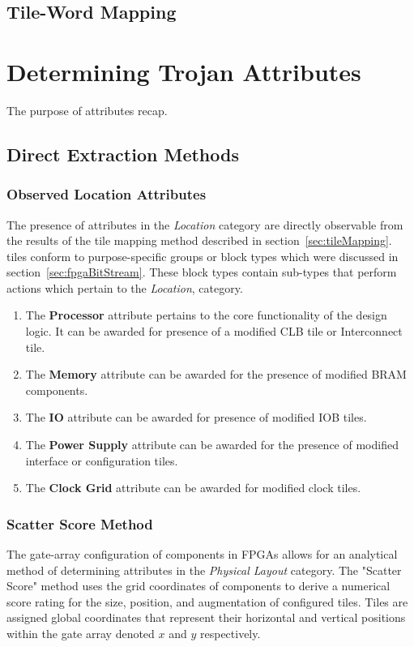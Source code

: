 \subsection{Tile-Word Mapping}

\section{Determining Trojan Attributes} \label{sec:trojanAttributes}
The purpose of attributes recap.
\subsection{Direct Extraction Methods}
\subsubsection{Observed Location Attributes}
The presence of attributes in the \textit{Location} category are directly observable from the results of the tile mapping method described in section~\ref{sec:tileMapping}.
\Xilinx tiles conform to purpose-specific groups or block types which were discussed in section~\ref{sec:fpgaBitStream}.
These block types contain sub-types that perform actions which pertain to the \textit{Location}, category. 
\begin{enumerate}
	\item The \textbf{Processor} attribute pertains to the core functionality of the design logic. It can be awarded for presence of a modified \acrshort{CLB} tile or Interconnect tile.
	\item The \textbf{Memory} attribute can be awarded for the presence of modified \acrshort{BRAM} components.
	\item The \textbf{\acrshort{IO}} attribute can be awarded for presence of modified \acrshort{IOB} tiles.
	\item The \textbf{Power Supply} attribute can be awarded for the presence of modified interface or configuration tiles.
	\item The \textbf{Clock Grid} attribute can be awarded for modified clock tiles.
\end{enumerate}
\subsubsection{Scatter Score Method}
The gate-array configuration of components in \Xilinx \acrshort{FPGA}s allows for an analytical method of determining attributes in the \textit{Physical Layout} category.
The "Scatter Score" method uses the grid coordinates of components to derive a numerical score rating for the size, position, and augmentation of configured tiles.
Tiles are assigned global coordinates that represent their horizontal and vertical positions within the gate array denoted $x$ and $y$ respectively. 

